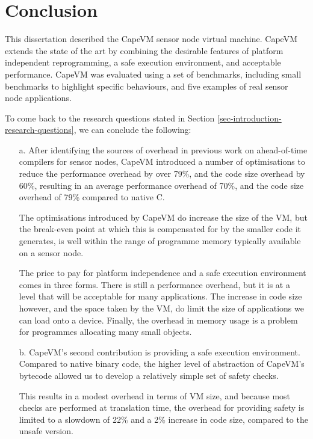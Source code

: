 \chapter{Conclusion}
This dissertation described the CapeVM sensor node virtual machine. CapeVM extends the state of the art by combining the desirable features of platform independent reprogramming, a safe execution environment, and acceptable performance. CapeVM was evaluated using a set of benchmarks, including small benchmarks to highlight specific behaviours, and five examples of real sensor node applications.

To come back to the research questions stated in Section \ref{sec-introduction-research-questions}, we can conclude the following:

\begin{enumerate}
	\item[a.]
	After identifying the sources of overhead in previous work on ahead-of-time compilers for sensor nodes, CapeVM introduced a number of optimisations to reduce the performance overhead by over 79\%, and the code size overhead by 60\%, resulting in an average performance overhead of 70\%, and the code size overhead of 79\% compared to native C.

	The optimisations introduced by CapeVM do increase the size of the VM, but the break-even point at which this is compensated for by the smaller code it generates, is well within the range of programme memory typically available on a sensor node.

	The price to pay for platform independence and a safe execution environment comes in three forms. There is still a performance overhead, but it is at a level that will be acceptable for many applications. The increase in code size however, and the space taken by the VM, do limit the size of applications we can load onto a device. Finally, the overhead in memory usage is a problem for programmes allocating many small objects.

	\item[b.]
	CapeVM's second contribution is providing a safe execution environment. Compared to native binary code, the higher level of abstraction of CapeVM's bytecode allowed us to develop a relatively simple set of safety checks.
	
	This results in a modest overhead in terms of VM size, and because most checks are performed at translation time, the overhead for providing safety is limited to a slowdown of 22\% and a 2\% increase in code size, compared to the unsafe version.
	

\end{enumerate}
